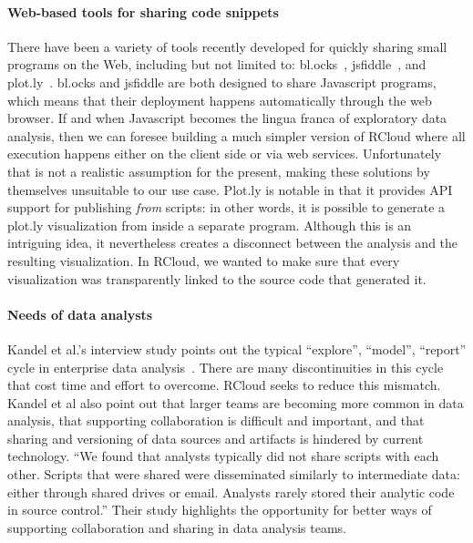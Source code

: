 \paragraph*{Web-based tools for sharing code snippets}
There have been a variety of tools recently developed for quickly
sharing small programs on the Web, including but not limited to:
bl.ocks~\cite{blocks}, jsfiddle~\cite{jsfiddle}, and
plot.ly~\cite{plotly}.  bl.ocks and jsfiddle are both designed to
share Javascript programs, which means that their deployment happens
automatically through the web browser. If and when Javascript becomes
the lingua franca of exploratory data analysis, then we can foresee
building a much simpler version of RCloud where all execution happens
either on the client side or via web services. Unfortunately that is
not a realistic assumption for the present, making these solutions by
themselves unsuitable to our use case. Plot.ly is notable in that it
provides API support for publishing \emph{from} scripts: in other
words, it is possible to generate a plot.ly visualization from inside
a separate program. Although this is an intriguing idea, it
nevertheless creates a disconnect between the analysis and the
resulting visualization. In RCloud, we wanted to make sure that every
visualization was transparently linked to the source code that
generated it.





\paragraph*{Needs of data analysts}
Kandel et al.'s interview study points out the typical ``explore'',
``model'', ``report'' cycle in enterprise data
analysis~\cite{Kandel:2012:EDA}. There are many discontinuities in
this cycle that cost time and effort to overcome. RCloud seeks to
reduce this mismatch. Kandel et al also point out that larger teams
are becoming more common in data analysis, that supporting
collaboration is difficult and important, and that sharing
and versioning of data sources and artifacts is hindered by current
technology. ``We found that analysts typically did not
share scripts with each other. Scripts that were shared were
disseminated similarly to intermediate data: either through shared
drives or email. Analysts rarely stored their analytic code in source
control.'' Their study highlights the opportunity for better ways
of supporting collaboration and sharing in data analysis teams.

